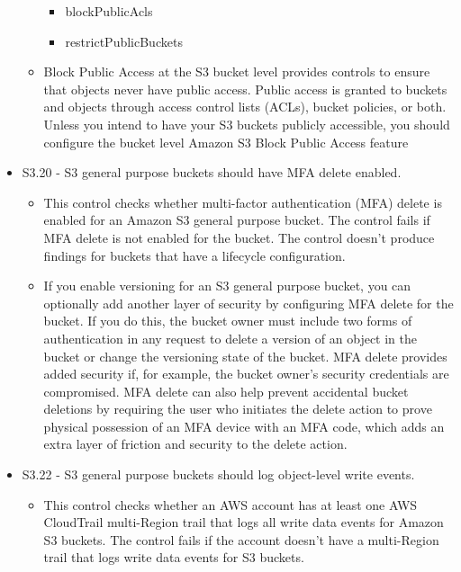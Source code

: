 \begin{mdframed}[backgroundcolor=gray!05, linecolor=gray!50]
\begin{itemize}
\begin{itemize}
\begin{itemize}
            \item blockPublicAcls
            \item restrictPublicBuckets
        \end{itemize}
        \item Block Public Access at the S3 bucket level provides controls to ensure that objects never have public access. Public access is granted to buckets and objects through access control lists (ACLs), bucket policies, or both. Unless you intend to have your S3 buckets publicly accessible, you should configure the bucket level Amazon S3 Block Public Access feature
    \end{itemize}
    \item S3.20 - S3 general purpose buckets should have MFA delete enabled.
    \begin{itemize}
        \item This control checks whether multi-factor authentication (MFA) delete is enabled for an Amazon S3 general purpose bucket. The control fails if MFA delete is not enabled for the bucket. The control doesn't produce findings for buckets that have a lifecycle configuration.
        \item If you enable versioning for an S3 general purpose bucket, you can optionally add another layer of security by configuring MFA delete for the bucket. If you do this, the bucket owner must include two forms of authentication in any request to delete a version of an object in the bucket or change the versioning state of the bucket. MFA delete provides added security if, for example, the bucket owner's security credentials are compromised. MFA delete can also help prevent accidental bucket deletions by requiring the user who initiates the delete action to prove physical possession of an MFA device with an MFA code, which adds an extra layer of friction and security to the delete action.
    \end{itemize}
    \item S3.22 - S3 general purpose buckets should log object-level write events.
    \begin{itemize}
        \item This control checks whether an AWS account has at least one AWS CloudTrail multi-Region trail that logs all write data events for Amazon S3 buckets. The control fails if the account doesn't have a multi-Region trail that logs write data events for S3 buckets.

\end{itemize}
\end{itemize}
\end{mdframed}

